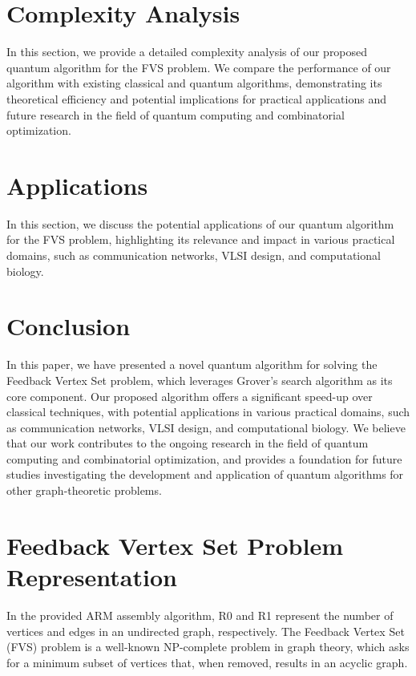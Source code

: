\section{Complexity Analysis}\label{sec:analysis}

In this section, we provide a detailed complexity analysis of our proposed quantum algorithm for the FVS problem. We compare the performance of our algorithm with existing classical and quantum algorithms, demonstrating its theoretical efficiency and potential implications for practical applications and future research in the field of quantum computing and combinatorial optimization.

\section{Applications}\label{sec:applications}

In this section, we discuss the potential applications of our quantum algorithm for the FVS problem, highlighting its relevance and impact in various practical domains, such as communication networks, VLSI design, and computational biology.

\section{Conclusion}\label{sec:conclusion}

In this paper, we have presented a novel quantum algorithm for solving the Feedback Vertex Set problem, which leverages Grover's search algorithm as its core component. Our proposed algorithm offers a significant speed-up over classical techniques, with potential applications in various practical domains, such as communication networks, VLSI design, and computational biology. We believe that our work contributes to the ongoing research in the field of quantum computing and combinatorial optimization, and provides a foundation for future studies investigating the development and application of quantum algorithms for other graph-theoretic problems.






\section{Feedback Vertex Set Problem Representation}

In the provided ARM assembly algorithm, R0 and R1 represent the number of vertices and edges in an undirected graph, respectively. The Feedback Vertex Set (FVS) problem is a well-known NP-complete problem in graph theory, which asks for a minimum subset of vertices that, when removed, results in an acyclic graph.

